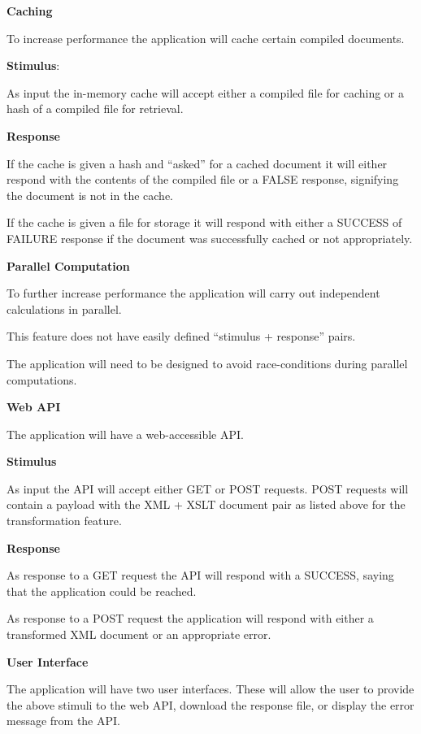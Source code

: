 \textbf{Caching}

To increase performance the application will cache certain compiled documents.
\begin{description}
  \item{
    \textbf{Stimulus}:

    As input the in-memory cache will accept either a compiled file for caching or a hash of a compiled file for retrieval.
  }
  \item{
    \textbf{Response}

    If the cache is given a hash and ``asked'' for a cached document it will either respond with the contents of the compiled file or a FALSE response, signifying the document is not in the cache.

    If the cache is given a file for storage it will respond with either a SUCCESS of FAILURE response if the document was successfully cached or not appropriately.
  }
\end{description}

\textbf{Parallel Computation}

To further increase performance the application will carry out independent calculations in parallel.

This feature does not have easily defined ``stimulus + response'' pairs.

The application will need to be designed to avoid race-conditions during parallel computations.

\textbf{Web API}

The application will have a web-accessible API.

\begin{description}
  \item{
    \textbf{Stimulus}

    As input the API will accept either GET or POST requests.
    POST requests will contain a payload with the XML + XSLT document pair as listed above for the transformation feature.
  }
  \item{
    \textbf{Response}

    As response to a GET request the API will respond with a SUCCESS, saying that the application could be reached.

    As response to a POST request the application will respond with either a transformed XML document or an appropriate error.
  }
\end{description}

\textbf{User Interface}

The application will have two user interfaces.
These will allow the user to provide the above stimuli to the web API, download the response file, or display the error message from the API.

